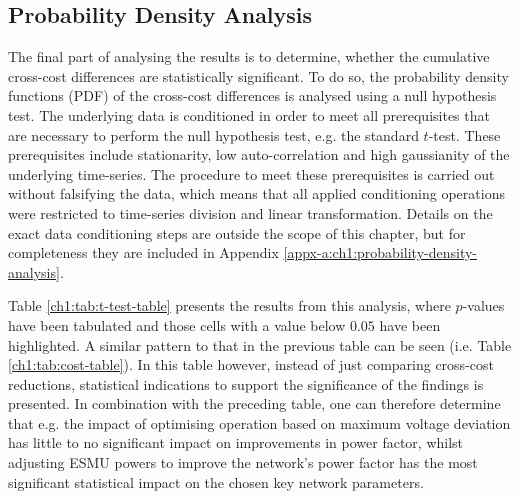 \subsection{Probability Density Analysis}
\label{ch1:subsec:probability-density-analysis}

The final part of analysing the results is to determine, whether the cumulative cross-cost differences are statistically significant.
To do so, the probability density functions (PDF) of the cross-cost differences is analysed using a null hypothesis test.
The underlying data is conditioned in order to meet all prerequisites that are necessary to perform the null hypothesis test, e.g. the standard $t$-test.
These prerequisites include stationarity, low auto-correlation and high gaussianity of the underlying time-series.
The procedure to meet these prerequisites is carried out without falsifying the data, which means that all applied conditioning operations were restricted to time-series division and linear transformation.
Details on the exact data conditioning steps are outside the scope of this chapter, but for completeness they are included in Appendix \ref{appx-a:ch1:probability-density-analysis}.



Table \ref{ch1:tab:t-test-table} presents the results from this analysis, where $p$-values have been tabulated and those cells with a value below $0.05$ have been highlighted.
A similar pattern to that in the previous table can be seen (i.e. Table \ref{ch1:tab:cost-table}).
In this table however, instead of just comparing cross-cost reductions, statistical indications to support the significance of the findings is presented.
In combination with the preceding table, one can therefore determine that e.g. the impact of optimising operation based on maximum voltage deviation has little to no significant impact on improvements in power factor, whilst adjusting ESMU powers to improve the network's power factor has the most significant statistical impact on the chosen key network parameters.